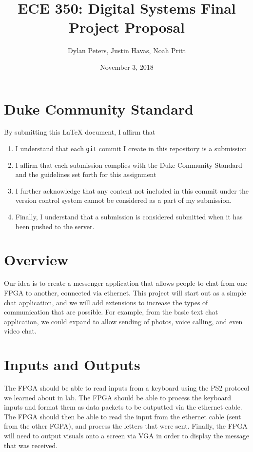 \documentclass[letterpaper]{article}
\begin{document}
\title{ECE 350: Digital Systems Final Project Proposal}
\author{Dylan Peters, Justin Havas, Noah Pritt}
\date{November 3, 2018}
\maketitle

\section*{Duke Community Standard}

By submitting this \LaTeX{} document, I affirm that
\begin{enumerate}
    \item I understand that each \texttt{git} commit I create in this repository is a submission
    \item I affirm that each submission complies with the Duke Community Standard and the guidelines set forth for this assignment
    \item I further acknowledge that any content not included in this commit under the version control system cannot be considered as a part of my submission.
    \item Finally, I understand that a submission is considered submitted when it has been pushed to the server.
\end{enumerate}

\section{Overview}
Our idea is to create a messenger application that allows people to chat from one FPGA to another, connected via ethernet. This project will start out as a simple chat application, and we will add extensions to increase the types of communication that are possible. For example, from the basic text chat application, we could expand to allow sending of photos, voice calling, and even video chat.

\section{Inputs and Outputs}
The FPGA should be able to read inputs from a keyboard using the PS2 protocol we learned about in lab.
The FPGA should be able to process the keyboard inputs and format them as data packets to be outputted via the ethernet cable.
The FPGA should then be able to read the input from the ethernet cable (sent from the other FGPA), and process the letters that were sent.
Finally, the FPGA will need to output visuals onto a screen via VGA in order to display the message that was received.
\end{document}
